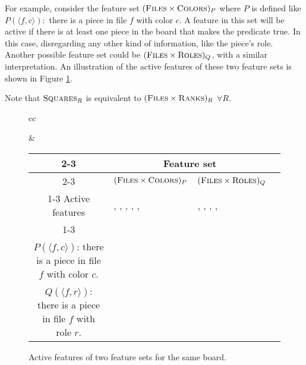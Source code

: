 
For example, consider the feature set $(\textsc{Files} \times \textsc{Colors})_{P}$ where $P$ is defined like $P(\langle f, c \rangle): $ there is a piece in file $f$ with color $c$. A feature in this set will be active if there is at least one piece in the board that makes the predicate true. In this case, disregarding any other kind of information, like the piece's role.
Another possible feature set could be $(\textsc{Files} \times \textsc{Roles})_{Q}$, with a similar interpretation. An illustration of the active features of these two feature sets is shown in Figure \ref{fig:active_features}.

Note that $\textsc{Squares}_R$ is equivalent to $(\textsc{Files} \times \textsc{Ranks})_R$ $\forall R$.

\begin{figure}[H]
\centering

\begin{tabular}{cc}
\raisebox{-7ex}{
\chessboard[
    tinyboard,
    showmover=false,
    hlabel=false,
    setwhite={kc3, nc2, pa2, Pd4},
    addblack={Kc8,bh7, pa7}
]
}

&

\begin{tabular}{|c|p{4cm}|p{4cm}|p{0cm}}
\cline{2-3}
\multicolumn{1}{c|}{} & \multicolumn{2}{c|}{\centering Feature set} \\
\cline{2-3}
\multicolumn{1}{c|}{} & \centering $(\textsc{Files} \times \textsc{Colors})_{P}$ & \centering $(\textsc{Files} \times \textsc{Roles})_{Q}$ & \\
\cline{1-3}
Active features &
\feature{a, \white}, \feature{a, \black}, \feature{c, \black}, \feature{c, \white}, \feature{d, \white}, \feature{h, \black} &
\feature{a, \sympawn}, \feature{c, \symking}, \feature{c, \symknight}, \feature{d, \sympawn}, \feature{h, \symbishop} \\
\cline{1-3}

\multicolumn{3}{c}{
\makecell{
~\\
$P(\langle f,c \rangle)$: there is a piece in file $f$ with color $c$.\\
$Q(\langle f,r \rangle)$: there is a piece in file $f$ with role $r$.
}    
}

\end{tabular}
\end{tabular}

\caption{Active features of two feature sets for the same board.}
\label{fig:active_features}
\end{figure}


